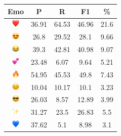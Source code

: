 \documentclass{article}
\begin{document}
\begin{table}
\centering
\begin{tabular}{|c|ccc|c|} \hline
\textbf{Emo} & \textbf{P} & \textbf{R} & \textbf{F1} & \textbf{\%} \\ \hline
\includegraphics[height=0.37cm,width=0.37cm]{img/red_heart.png} & 36.91 & 64.53 & 46.96 & 21.6\\ 
\includegraphics[height=0.37cm,width=0.37cm]{img/smiling_face_with_hearteyes.png} & 26.8 & 29.52 & 28.1 & 9.66\\ 
\includegraphics[height=0.37cm,width=0.37cm]{img/face_with_tears_of_joy.png} & 39.3 & 42.81 & 40.98 & 9.07\\ 
\includegraphics[height=0.37cm,width=0.37cm]{img/two_hearts.png} & 23.48 & 6.07 & 9.64 & 5.21\\ 
\includegraphics[height=0.37cm,width=0.37cm]{img/fire.png} & 54.95 & 45.53 & 49.8 & 7.43\\ 
\includegraphics[height=0.37cm,width=0.37cm]{img/smiling_face_with_smiling_eyes.png} & 10.04 & 10.17 & 10.1 & 3.23\\ 
\includegraphics[height=0.37cm,width=0.37cm]{img/smiling_face_with_sunglasses.png} & 26.03 & 8.57 & 12.89 & 3.99\\ 
\includegraphics[height=0.37cm,width=0.37cm]{img/sparkles.png} & 31.27 & 23.5 & 26.83 & 5.5\\ 
\includegraphics[height=0.37cm,width=0.37cm]{img/blue_heart.png} & 37.62 & 5.1 & 8.98 & 3.1\\ 

\end{tabular}
\end{table}
\end{document}
